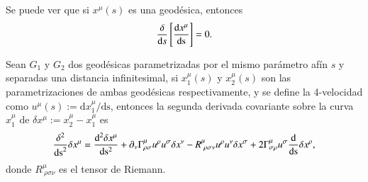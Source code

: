 Se puede ver que si $x^{\mu}(s)$ es una geodésica, entonces
\begin{equation}
\frac{\delta  }{\mathrm{d}s} \left[ \dv{x^{\mu}}{ \mathrm{s} } \right] = 0.
\end{equation} 

\begin{lemma}
\label{lema:1}
Sean $G_1$ y $G_2$ dos geodésicas parametrizadas por el mismo parámetro afín $s$ y separadas una distancia infinitesimal, si $x^{\mu}_1(s)$ y $x^{\mu}_2(s)$ son las parametrizaciones de ambas geodésicas respectivamente, y se define la 4-velocidad como $u^{\mu}(s) := \mathrm{d}x^{\mu}_1/\mathrm{ds}$, entonces la segunda derivada covariante sobre la curva $x^{\mu}_1$ de $\delta x^{\mu}:= x^{\mu}_2 - x^{\mu}_1$ es
\begin{equation}
\label{eq:10}
\frac{\delta^2}{\mathrm{ds}^2}\delta x^{\mu} = \dv[2]{\delta x^{\mu}}{ \mathrm{s} } + \partial_{\nu} \Gamma^{\mu}_{\rho \sigma} u^{\rho} u^{\sigma} \delta x^{\nu} - R^{\mu}_{\ \rho \sigma \nu} u^{\rho} u^{\nu} \delta x^{\sigma} + 2 \Gamma^{\mu}_{\sigma \rho} u^{\sigma} \dv{ }{ \mathrm{s} } \delta x^{\rho}, 
\end{equation}
donde $R^{\mu}_{\ \rho \sigma \nu}$ es el tensor de Riemann.
\end{lemma}
